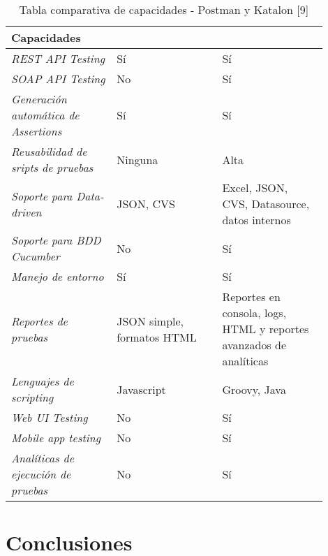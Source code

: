 \documentclass[twoside,twocolumn]{article}
\begin{document}
\begin{table*}[]
\begin{tabular}{p{0.3\linewidth} | p{0.3\linewidth} | p{0.3\linewidth}}
\toprule
\textbf{Capacidades}              & \cellcolor[HTML]{FFFFFF}{\color[HTML]{FF6D2A} \textbf{Postman}} & \cellcolor[HTML]{FFFFFF}{\color[HTML]{0EA4DD} \textbf{Katalon}}    \\ \midrule
\textit{REST API Testing}                    & Sí         & Sí           \\
\textit{SOAP API Testing}                    & No         & Sí           \\
\textit{Generación automática de Assertions} & Sí         & Sí           \\
\textit{Reusabilidad de sripts de pruebas}   & Ninguna    & Alta         \\
\textit{Soporte para Data-driven} & JSON, CVS                                                       & Excel, JSON, CVS, Datasource, datos internos                       \\
\textit{Soporte para BDD Cucumber}           & No         & Sí           \\
\textit{Manejo de entorno}                   & Sí         & Sí           \\
\textit{Reportes de pruebas}      & JSON simple, formatos HTML                                      & Reportes en consola, logs, HTML y reportes avanzados de analíticas \\
\textit{Lenguajes de scripting}              & Javascript & Groovy, Java \\
\textit{Web UI Testing}                      & No         & Sí           \\
\textit{Mobile app testing}                  & No         & Sí           \\
\textit{Analíticas de ejecución de pruebas}  & No         & Sí           \\ \bottomrule
\end{tabular}
\caption{Tabla comparativa de capacidades - Postman y Katalon [9]}
\label{tabla1}
\end{table*}




\section{Conclusiones}
\end{document}
